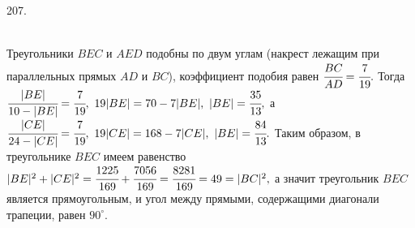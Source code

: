 207. \begin{figure}[ht!]
\end{figure}\\
Треугольники $BEC$ и $AED$ подобны по двум углам (накрест лежащим при параллельных прямых $AD$ и $BC$), коэффициент подобия равен $\cfrac{BC}{AD}=
\cfrac{7}{19}.$ Тогда $\cfrac{|BE|}{10-|BE|}=\cfrac{7}{19},\ 19|BE|=70-7|BE|,\ |BE|=\cfrac{35}{13},$ а $\cfrac{|CE|}{24-|CE|}=\cfrac{7}{19},\ 19|CE|=168-7|CE|,\ |BE|=\cfrac{84}{13}.$ Таким образом, в треугольнике $BEC$ имеем равенство $|BE|^2+|CE|^2=\cfrac{1225}{169}+\cfrac{7056}{169}=\cfrac{8281}{169}=49=|BC|^2,$ а значит треугольник $BEC$ является прямоугольным, и угол между прямыми, содержащими диагонали трапеции, равен $90^\circ.$\\
